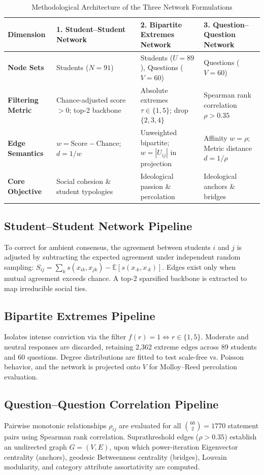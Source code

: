 \documentclass[10pt, a4paper]{article}
\begin{document}
\begin{table}[H]
\centering
\small
\caption{Methodological Architecture of the Three Network Formulations}
\label{tab:pipeline_summary}
\begin{tabular}{p{2.6cm} p{4.3cm} p{4.6cm} p{4.3cm}}
\toprule
\textbf{Dimension} & \textbf{1. Student--Student Network} & \textbf{2. Bipartite Extremes Network} & \textbf{3. Question--Question Network} \\
\midrule
\textbf{Node Sets} & Students ($N=91$) & Students ($U=89$), Questions ($V=60$) & Questions ($V=60$) \\
\textbf{Filtering Metric} & Chance-adjusted score $>0$; top-2 backbone & Absolute extremes $\tau \in \{1, 5\}$; drop $\{2, 3, 4\}$ & Spearman rank correlation $\rho > 0.35$ \\
\textbf{Edge Semantics} & $w = \text{Score} - \text{Chance}$; $d = 1/w$ & Unweighted bipartite; $w = |U_{ij}|$ in projection & Affinity $w = \rho$; Metric distance $d = 1/\rho$ \\
\textbf{Core Objective} & Social cohesion \& student typologies & Ideological passion \& percolation & Ideological anchors \& bridges \\
\bottomrule
\end{tabular}
\end{table}

\subsection{Student--Student Network Pipeline}
To correct for ambient consensus, the agreement between students $i$ and $j$ is adjusted by subtracting the expected agreement under independent random sampling: $S_{ij} = \sum_{k} s(x_{ik}, x_{jk}) - \mathbb{E}[s(x_{\cdot k}, x_{\cdot k})]$. Edges exist only when mutual agreement exceeds chance. A top-2 sparsified backbone is extracted to map irreducible social ties.

\subsection{Bipartite Extremes Pipeline}
Isolates intense conviction via the filter $f(r) = 1 \iff r \in \{1, 5\}$. Moderate and neutral responses are discarded, retaining 2,362 extreme edges across 89 students and 60 questions. Degree distributions are fitted to test scale-free vs. Poisson behavior, and the network is projected onto $V$ for Molloy--Reed percolation evaluation.

\subsection{Question--Question Correlation Pipeline}
Pairwise monotonic relationships $\rho_{ij}$ are evaluated for all $\binom{60}{2} = 1770$ statement pairs using Spearman rank correlation. Suprathreshold edges ($\rho > 0.35$) establish an undirected graph $G = (V, E)$, upon which power-iteration Eigenvector centrality (anchors), geodesic Betweenness centrality (bridges), Louvain modularity, and category attribute assortativity are computed.
\end{document}
